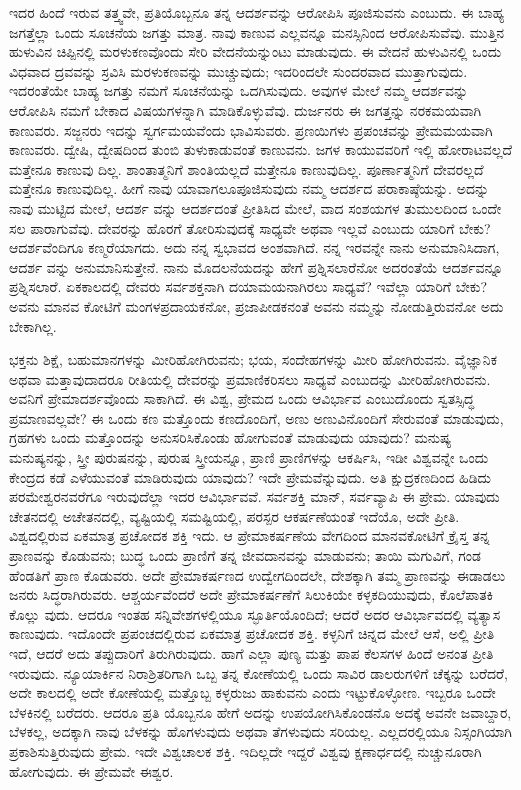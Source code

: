 ಇದರ ಹಿಂದೆ ಇರುವ ತತ್ತ್ವವೇ, ಪ್ರತಿಯೊಬ್ಬನೂ ತನ್ನ ಆದರ್ಶವನ್ನು ಆರೋಪಿಸಿ ಪೂಜಿಸುವನು ಎಂಬುದು. ಈ ಬಾಹ್ಯ ಜಗತ್ತೆಲ್ಲಾ ಒಂದು ಸೂಚನೆಯ ಜಗತ್ತು ಮಾತ್ರ. ನಾವು ಕಾಣುವ ಎಲ್ಲವನ್ನೂ ಮನಸ್ಸಿನಿಂದ ಆರೋಪಿಸುವೆವು. ಮುತ್ತಿನ ಹುಳುವಿನ ಚಿಪ್ಪಿನಲ್ಲಿ ಮರಳುಕಣವೊಂದು ಸೇರಿ ವೇದನೆಯನ್ನುಂಟು ಮಾಡುವುದು. ಈ ವೇದನೆ ಹುಳುವಿನಲ್ಲಿ ಒಂದು ವಿಧವಾದ ದ್ರವವನ್ನು ಸ್ರವಿಸಿ ಮರಳುಕಣವನ್ನು ಮುಚ್ಚುವುದು; ಇದರಿಂದಲೇ ಸುಂದರವಾದ ಮುತ್ತಾಗುವುದು. ಇದರಂತೆಯೇ ಬಾಹ್ಯ ಜಗತ್ತು ನಮಗೆ ಸೂಚನೆಯನ್ನು ಒದಗಿಸುವುದು. ಅವುಗಳ ಮೇಲೆ ನಮ್ಮ ಆದರ್ಶವನ್ನು ಆರೋಪಿಸಿ ನಮಗೆ ಬೇಕಾದ ವಿಷಯ\-ಗಳನ್ನಾಗಿ ಮಾಡಿಕೊಳ್ಳುವೆವು. ದುರ್ಜನರು ಈ ಜಗತ್ತನ್ನು ನರಕಮಯವಾಗಿ ಕಾಣುವರು. ಸಜ್ಜನರು ಇದನ್ನು ಸ್ವರ್ಗಮಯವೆಂದು ಭಾವಿಸುವರು. ಪ್ರಣಯಿಗಳು ಪ್ರಪಂಚವನ್ನು ಪ್ರೇಮಮಯವಾಗಿ ಕಾಣುವರು. ದ್ವೇಷಿ, ದ್ವೇಷದಿಂದ ತುಂಬಿ ತುಳುಕಾಡುವಂತೆ ಕಾಣುವನು. ಜಗಳ ಕಾಯುವವರಿಗೆ ಇಲ್ಲಿ ಹೋರಾಟವಲ್ಲದೆ ಮತ್ತೇನೂ ಕಾಣುವು ದಿಲ್ಲ. ಶಾಂತಾತ್ಮನಿಗೆ ಶಾಂತಿಯಲ್ಲದೆ ಮತ್ತೇನೂ ಕಾಣುವುದಿಲ್ಲ. ಪೂರ್ಣಾತ್ಮನಿಗೆ ದೇವರಲ್ಲದೆ ಮತ್ತೇನೂ ಕಾಣುವುದಿಲ್ಲ. ಹೀಗೆ ನಾವು ಯಾವಾಗಲೂಪೂಜಿಸುವುದು ನಮ್ಮ ಆದರ್ಶದ ಪರಾಕಾಷ್ಠೆಯನ್ನು. ಅದನ್ನು ನಾವು ಮುಟ್ಟಿದ ಮೇಲೆ, ಆದರ್ಶ ವನ್ನು ಆದರ್ಶದಂತೆ ಪ್ರೀತಿಸಿದ ಮೇಲೆ, ವಾದ ಸಂಶಯಗಳ ತುಮುಲದಿಂದ ಒಂದೇ ಸಲ ಪಾರಾಗುವೆವು. ದೇವರನ್ನು ಹೊರಗೆ ತೋರಿಸುವುದಕ್ಕೆ ಸಾಧ್ಯವೇ ಅಥವಾ ಇಲ್ಲವೆ ಎಂಬುದು ಯಾರಿಗೆ ಬೇಕು? ಆದರ್ಶವೆಂದಿಗೂ ಕಣ್ಮರೆಯಾಗದು. ಅದು ನನ್ನ ಸ್ವಭಾವದ ಅಂಶವಾಗಿದೆ. ನನ್ನ ಇರವನ್ನೇ ನಾನು ಅನುಮಾನಿಸಿದಾಗ, ಆದರ್ಶ ವನ್ನು ಅನುಮಾನಿಸುತ್ತೇನೆ. ನಾನು ಮೊದಲ\-ನೆಯದನ್ನು ಹೇಗೆ ಪ್ರಶ್ನಿಸಲಾರೆನೋ ಅದರಂತೆಯೆ ಆದರ್ಶವನ್ನೂ ಪ್ರಶ್ನಿಸಲಾರೆ. ಏಕಕಾಲದಲ್ಲಿ ದೇವರು ಸರ್ವಶಕ್ತನಾಗಿ ದಯಾಮಯನಾಗಿರಲು ಸಾಧ್ಯವೆ? ಇವೆಲ್ಲಾ ಯಾರಿಗೆ ಬೇಕು? ಅವನು ಮಾನವ ಕೋಟಿಗೆ ಮಂಗಳಪ್ರದಾಯಕನೋ, ಪ್ರಜಾಪೀಡಕನಂತೆ ಅವನು ನಮ್ಮನ್ನು ನೋಡುತ್ತಿರುವನೋ ಅದು ಬೇಕಾಗಿಲ್ಲ.

ಭಕ್ತನು ಶಿಕ್ಷೆ, ಬಹುಮಾನಗಳನ್ನು ಮೀರಿಹೋಗಿರುವನು; ಭಯ, ಸಂದೇಹಗಳನ್ನು ಮೀರಿ ಹೋಗಿರುವನು. ವೈಜ್ಞಾನಿಕ ಅಥವಾ ಮತ್ತಾವುದಾದರೂ ರೀತಿಯಲ್ಲಿ ದೇವರನ್ನು ಪ್ರಮಾಣಿಕರಿಸಲು ಸಾಧ್ಯವೆ ಎಂಬುದನ್ನು ಮೀರಿಹೋಗಿರುವನು. ಅವನಿಗೆ ಪ್ರೇಮಾದರ್ಶವೊಂದು ಸಾಕಾಗಿದೆ. ಈ ವಿಶ್ವ, ಪ್ರೇಮದ ಒಂದು ಆವಿರ್ಭಾವ ಎಂಬುದೊಂದು ಸ್ವತಸ್ಸಿದ್ಧ ಪ್ರಮಾಣವಲ್ಲವೇ? ಈ ಒಂದು ಕಣ ಮತ್ತೊಂದು ಕಣದೊಂದಿಗೆ, ಅಣು ಅಣುವಿನೊಂದಿಗೆ ಸೇರುವಂತೆ ಮಾಡುವುದು, ಗ್ರಹಗಳು ಒಂದು ಮತ್ತೊಂದನ್ನು ಅನುಸರಿಸಿಕೊಂಡು ಹೋಗುವಂತೆ ಮಾಡುವುದು ಯಾವುದು? ಮನುಷ್ಯ ಮನುಷ್ಯನನ್ನು, ಸ್ತ್ರೀ ಪುರುಷನನ್ನು, ಪುರುಷ ಸ್ತ್ರೀಯನ್ನೂ, ಪ್ರಾಣಿ ಪ್ರಾಣಿಗಳನ್ನು ಆಕರ್ಷಿಸಿ, ಇಡೀ ವಿಶ್ವವನ್ನೇ ಒಂದು ಕೇಂದ್ರದ ಕಡೆ ಎಳೆಯುವಂತೆ ಮಾಡಿರುವುದು ಯಾವುದು? ಇದೇ ಪ್ರೇಮವೆನ್ನುವುದು. ಅತಿ ಕ್ಷುದ್ರಕಣದಿಂದ ಹಿಡಿದು ಪರಮೇಶ್ವರನವರೆಗೂ ಇರುವುದೆಲ್ಲಾ ಇದರ ಆವಿರ್ಭಾವವೆ. ಸರ್ವಶಕ್ತಿ ಮಾನ್​, ಸರ್ವವ್ಯಾಪಿ ಈ ಪ್ರೇಮ. ಯಾವುದು ಚೇತನದಲ್ಲಿ ಅಚೇತನದಲ್ಲಿ, ವ್ಯಷ್ಟಿಯಲ್ಲಿ ಸಮಷ್ಟಿಯಲ್ಲಿ, ಪರಸ್ಪರ ಆಕರ್ಷಣೆಯಂತೆ ಇದೆಯೊ, ಅದೇ ಪ್ರೀತಿ. ವಿಶ್ವದಲ್ಲಿರುವ ಏಕಮಾತ್ರ ಪ್ರಚೋದಕ ಶಕ್ತಿ ಇದು. ಆ ಪ್ರೇಮಾಕರ್ಷಣೆಯ ವೇಗದಿಂದ ಮಾನವಕೋಟಿಗೆ ಕ್ರೈಸ್ತ ತನ್ನ ಪ್ರಾಣವನ್ನು ಕೊಡುವನು; ಬುದ್ಧ ಒಂದು ಪ್ರಾಣಿಗೆ ತನ್ನ ಜೀವದಾನವನ್ನು ಮಾಡುವನು; ತಾಯಿ ಮಗುವಿಗೆ, ಗಂಡ ಹೆಂಡತಿಗೆ ಪ್ರಾಣ ಕೊಡುವರು. ಅದೇ ಪ್ರೇಮಾಕರ್ಷಣದ ಉದ್ವೇಗದಿಂದಲೇ, ದೇಶಕ್ಕಾಗಿ ತಮ್ಮ ಪ್ರಾಣವನ್ನು ಈಡಾಡಲು ಜನರು ಸಿದ್ಧರಾಗಿರುವರು. ಆಶ್ಚರ್ಯವೆಂದರೆ ಅದೇ ಪ್ರೇಮಾಕರ್ಷಣೆಗೆ ಸಿಲುಕಿಯೇ ಕಳ್ಳ\break ಕದಿಯುವುದು, ಕೊಲೆಪಾತಕಿ ಕೊಲ್ಲು ವುದು. ಆದರೂ ಇಂತಹ ಸನ್ನಿವೇಶಗಳಲ್ಲಿಯೂ ಸ್ಫೂರ್ತಿಯೊಂದಿದೆ; ಆದರೆ ಅದರ ಆವಿರ್ಭಾವದಲ್ಲಿ ವ್ಯತ್ಯಾಸ ಕಾಣುವುದು. ಇದೊಂದೇ ಪ್ರಪಂಚದಲ್ಲಿರುವ ಏಕಮಾತ್ರ ಪ್ರಚೋದಕ ಶಕ್ತಿ. ಕಳ್ಳನಿಗೆ ಚಿನ್ನದ ಮೇಲೆ ಆಸೆ, ಅಲ್ಲಿ ಪ್ರೀತಿ ಇದೆ, ಆದರೆ ಅದು ತಪ್ಪುದಾರಿಗೆ ತಿರುಗಿರುವುದು. ಹಾಗೆ ಎಲ್ಲಾ ಪುಣ್ಯ ಮತ್ತು ಪಾಪ ಕೆಲಸಗಳ ಹಿಂದೆ ಅನಂತ ಪ್ರೀತಿ ಇರುವುದು. ನ್ಯೂಯಾರ್ಕಿನ ನಿರಾಶ್ರಿತರಿಗಾಗಿ ಒಬ್ಬ ತನ್ನ ಕೋಣೆಯಲ್ಲಿ ಒಂದು ಸಾವಿರ ಡಾಲರುಗಳಿಗೆ ಚೆಕ್ಕನ್ನು ಬರೆದರೆ, ಅದೇ ಕಾಲದಲ್ಲಿ ಅದೇ ಕೋಣೆಯಲ್ಲಿ ಮತ್ತೊಬ್ಬ ಕಳ್ಳರುಜು ಹಾಕುವನು ಎಂದು ಇಟ್ಟುಕೊಳ್ಳೋಣ. ಇಬ್ಬರೂ ಒಂದೇ ಬೆಳಕಿನಲ್ಲಿ ಬರೆದರು. ಆದರೂ ಪ್ರತಿ ಯೊಬ್ಬನೂ ಹೇಗೆ ಅದನ್ನು ಉಪಯೋಗಿಸಿಕೊಂಡನೊ ಅದಕ್ಕೆ ಅವನೇ ಜವಾಬ್ದಾರ, ಬೆಳಕಲ್ಲ, ಅದಕ್ಕಾಗಿ ನಾವು ಬೆಳಕನ್ನು ಹೊಗಳುವುದು ಅಥವಾ ತೆಗಳುವುದು ಸರಿಯಲ್ಲ. ಎಲ್ಲದರಲ್ಲಿಯೂ ನಿಸ್ಸಂಗಿಯಾಗಿ ಪ್ರಕಾಶಿ\-ಸುತ್ತಿರುವುದು ಪ್ರೇಮ. ಇದೇ ವಿಶ್ವಚಾಲಕ ಶಕ್ತಿ. ಇದಿಲ್ಲದೇ ಇದ್ದರೆ ವಿಶ್ವವು ಕ್ಷಣಾರ್ಧದಲ್ಲಿ ನುಚ್ಚುನೂರಾಗಿ ಹೋಗುವುದು. ಈ ಪ್ರೇಮವೇ ಈಶ್ವರ.

